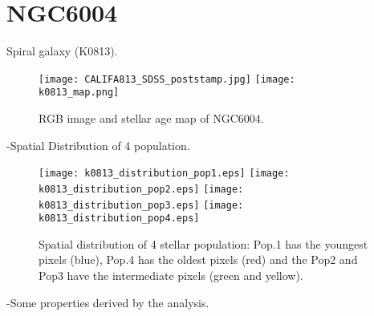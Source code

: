 \newpage
\section*{NGC6004}
Spiral galaxy (K0813).

\begin{figure}[bh]
\begin{center}
\texttt{[image: CALIFA813\_SDSS\_poststamp.jpg]}
\texttt{[image: k0813\_map.png]}
\caption{RGB image and stellar age map of NGC6004.}
   \label{fig1}
\end{center}
\end{figure}

-Spatial Distribution of 4 population.


\begin{figure}[bh]
\begin{center}
\texttt{[image: k0813\_distribution\_pop1.eps]}
\texttt{[image: k0813\_distribution\_pop2.eps]}
\texttt{[image: k0813\_distribution\_pop3.eps]}
\texttt{[image: k0813\_distribution\_pop4.eps]}
 \caption{Spatial distribution of 4 stellar population: Pop.1 has the youngest pixels (blue), Pop.4 has the oldest pixels (red) and the Pop2 and Pop3 have the intermediate pixels (green and yellow).}
   \label{fig1}
\end{center}
\end{figure}


-Some properties derived by the analysis.


